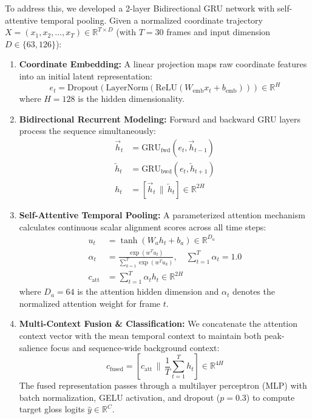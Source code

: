 \documentclass{article}
\begin{document}
To address this, we developed a 2-layer Bidirectional GRU network with self-attentive temporal pooling. Given a normalized coordinate trajectory $X = (x_1, x_2, \dots, x_T) \in \mathbb{R}^{T \times D}$ (with $T = 30$ frames and input dimension $D \in \{63, 126\}$):
\begin{enumerate}
    \item \textbf{Coordinate Embedding:} A linear projection maps raw coordinate features into an initial latent representation:
    \[
        e_t = \text{Dropout}(\text{LayerNorm}(\text{ReLU}(W_{\text{emb}} x_t + b_{\text{emb}}))) \in \mathbb{R}^H
    \]
    where $H = 128$ is the hidden dimensionality.
    
    \item \textbf{Bidirectional Recurrent Modeling:} Forward and backward GRU layers process the sequence simultaneously:
    \begin{align}
        \overrightarrow{h}_t &= \text{GRU}_{\text{fwd}}(e_t, \overrightarrow{h}_{t-1}) \\
        \overleftarrow{h}_t &= \text{GRU}_{\text{bwd}}(e_t, \overleftarrow{h}_{t+1}) \\
        h_t &= [\overrightarrow{h}_t \,\|\, \overleftarrow{h}_t] \in \mathbb{R}^{2H}
    \end{align}
    
    \item \textbf{Self-Attentive Temporal Pooling:} A parameterized attention mechanism calculates continuous scalar alignment scores across all time steps:
    \begin{align}
        u_t &= \tanh(W_a h_t + b_a) \in \mathbb{R}^{D_a} \\
        \alpha_t &= \frac{\exp(w^T u_t)}{\sum_{k=1}^T \exp(w^T u_k)}, \quad \sum_{t=1}^T \alpha_t = 1.0 \\
        c_{\text{att}} &= \sum_{t=1}^T \alpha_t h_t \in \mathbb{R}^{2H}
    \end{align}
    where $D_a = 64$ is the attention hidden dimension and $\alpha_t$ denotes the normalized attention weight for frame $t$.
    
    \item \textbf{Multi-Context Fusion \& Classification:} We concatenate the attention context vector with the mean temporal context to maintain both peak-salience focus and sequence-wide background context:
    \[
        c_{\text{fused}} = \left[ c_{\text{att}} \,\|\, \frac{1}{T}\sum_{t=1}^T h_t \right] \in \mathbb{R}^{4H}
    \]
    The fused representation passes through a multilayer perceptron (MLP) with batch normalization, GELU activation, and dropout ($p = 0.3$) to compute target gloss logits $\hat{y} \in \mathbb{R}^C$.
\end{enumerate}
\end{document}
